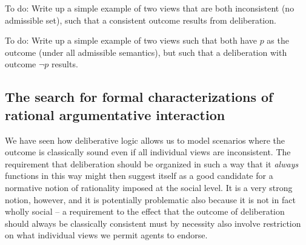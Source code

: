 \documentclass[greybox]{svmult}
\begin{document}
\begin{example}
\end{example}

\begin{example}\label{ex:wr}
To do: Write up a simple example of two views that are both inconsistent (no admissible set), such that a consistent outcome results from deliberation.
\end{example}

\begin{example}\label{ex:ad}
To do: Write up a simple example of two views such that both have $p$ as the outcome (under all admissible semantics), but such that a deliberation with outcome $\neg p$ results.
\end{example}

\subsection{The search for formal characterizations of rational argumentative interaction}\label{sub:for}

We have seen how deliberative logic allows us to model scenarios where the outcome is classically sound even if all individual views are inconsistent. The requirement that deliberation should be organized in such a way that it \emph{always} functions in this way might then suggest itself as a good candidate for a normative notion of rationality imposed at the social level. It is a very strong notion, however, and it is potentially problematic also because it is not in fact wholly social -- a requirement to the effect that the outcome of deliberation should always be classically consistent must by necessity also involve restriction on what individual views we permit agents to endorse. 
\end{document}
